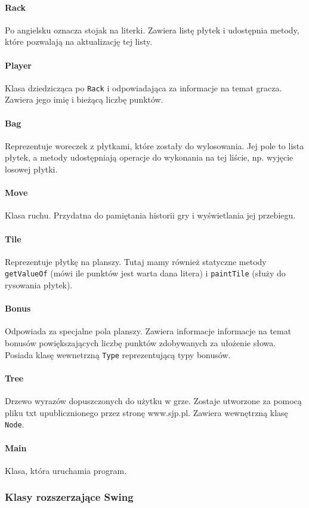 \documentclass[a4paper]{article}
\begin{document}
\paragraph{Rack} Po angielsku oznacza stojak na literki. Zawiera listę płytek i udostępnia metody, które pozwalają na aktualizację tej listy.
\paragraph{Player} Klasa dziedzicząca po \texttt{Rack} i odpowiadająca za informacje na temat gracza. Zawiera jego imię i bieżącą liczbę punktów.
\paragraph{Bag} Reprezentuje woreczek z płytkami, które zostały do wylosowania. Jej pole to lista płytek, a metody udostępniają operacje do wykonania na tej liście, np. wyjęcie losowej płytki.
\paragraph{Move} Klasa ruchu. Przydatna do pamiętania historii gry i wyświetlania jej przebiegu.
\paragraph{Tile} Reprezentuje płytkę na planszy. Tutaj mamy również statyczne metody \texttt{getValueOf} (mówi ile punktów jest warta dana litera) i \texttt{paintTile} (służy do rysowania płytek).
\paragraph{Bonus} Odpowiada za specjalne pola planszy. Zawiera informacje informacje na temat bonusów powiększających liczbę punktów zdobywanych za ułożenie słowa. Posiada klasę wewnetrzną \texttt{Type} reprezentującą typy bonusów.
\paragraph{Tree}
Drzewo wyrazów dopuszczonych do użytku w grze. Zostaje utworzone za pomocą pliku txt upublicznionego przez stronę www.sjp.pl. Zawiera wewnętrzną klasę \texttt{Node}. 
\paragraph{Main}
Klasa, która uruchamia program.
\subsubsection{Klasy rozszerzające Swing}
\end{document}
